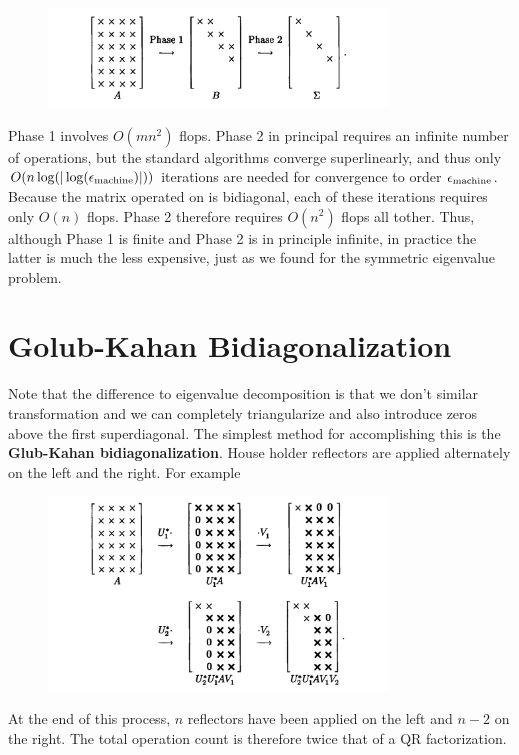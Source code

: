  \begin{figure}[H]
    \centering
    \includegraphics[width=0.8\textwidth]{figures/31-1.png}
 \end{figure}
 Phase 1 involves $ O(mn^{2} ) $ flops. Phase 2 in principal requires an infinite number of operations, but the standard algorithms converge superlinearly, and thus only $ O(n\log(|\log(\epsilon_{\text{machine}})|)) $ iterations are needed for convergence to order $ \epsilon_{\text{machine}} $. Because the matrix operated on is bidiagonal, each of these iterations requires only $ O(n) $ flops. Phase 2 therefore requires $ O(n^{2} ) $ flops all tother. Thus, although Phase 1 is finite and Phase 2 is in principle infinite, in practice the latter is much the less expensive, just as we found for the symmetric eigenvalue problem.  

 \section{Golub-Kahan Bidiagonalization} 
  Note that the difference to eigenvalue decomposition is that we don't similar transformation and we can completely triangularize and also introduce zeros above the first superdiagonal.  The simplest method for accomplishing this is the \textbf{Glub-Kahan bidiagonalization}.  House holder reflectors are applied alternately on the left and the right. For example 
  \begin{figure}[H]
    \centering
    \includegraphics[width=0.8\textwidth]{figures/31-2.png}
  \end{figure}
  At the end of this process, $n$ reflectors have been applied on the left and $n-2$ on the right. The total operation count is therefore twice that of a QR factorization. 


